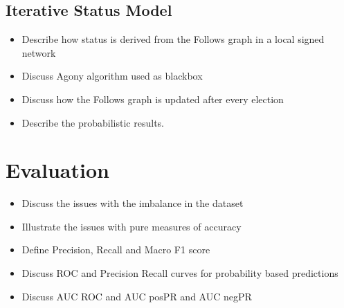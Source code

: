     \subsection{Iterative Status Model}
        \begin{itemize} 
            \item Describe how status is derived from the Follows graph in a local signed network 
            \item Discuss Agony algorithm used as blackbox
            \item Discuss how the Follows graph is updated after every election
            \item Describe the probabilistic results.
        \end{itemize}

\section{Evaluation}
\begin{itemize}
    \item Discuss the issues with the imbalance in the dataset
    \item Illustrate the issues with pure measures of accuracy
    \item Define Precision, Recall and Macro F1 score
    \item Discuss ROC and Precision Recall curves for probability based predictions 
    \item Discuss AUC ROC and AUC posPR and AUC negPR
\end{itemize}